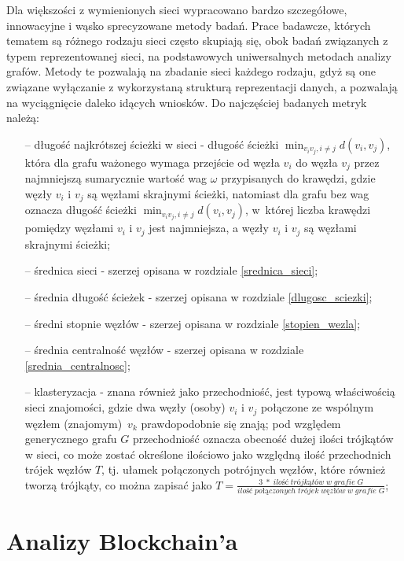 \documentclass[12pt, twoside, final, openany]{mgr}
\begin{document}
\indent Dla większości z wymienionych sieci wypracowano bardzo szczegółowe, innowacyjne i wąsko sprecyzowane metody badań. Prace badawcze, których tematem są różnego rodzaju sieci często skupiają się, obok badań związanych z typem reprezentowanej sieci, na podstawowych uniwersalnych metodach analizy grafów. Metody te pozwalają na zbadanie sieci każdego rodzaju, gdyż są one związane wyłączanie z wykorzystaną strukturą reprezentacji danych, a pozwalają na wyciągnięcie daleko idących wniosków. Do najczęściej badanych metryk należą\cite{barabasi2016network, wasserman1994social, Watts1998}:
\begin{itemize}
\item[--] długość najkrótszej ścieżki w sieci - długość ścieżki $\min_{v_iv_j, i \ne j} d(v_i, v_j)$, która dla grafu ważonego wymaga przejście od węzła $v_i$ do węzła $v_j$ przez najmniejszą sumarycznie wartość wag $\omega$ przypisanych do krawędzi, gdzie węzły $v_i$ i $v_j$ są węzłami skrajnymi ścieżki, natomiast dla grafu bez wag oznacza długość ścieżki $\min_{v_iv_j, i \ne j} d(v_i, v_j)$, w~której liczba krawędzi pomiędzy węzłami $v_i$ i $v_j$ jest najmniejsza, a węzły $v_i$ i $v_j$ są węzłami skrajnymi ścieżki;
\item[--] średnica sieci - szerzej opisana w rozdziale \ref{srednica_sieci};
\item[--] średnia długość ścieżek - szerzej opisana w rozdziale \ref{dlugosc_sciezki};
\item[--] średni stopnie węzłów - szerzej opisana w rozdziale \ref{stopien_wezla};
\item[--] średnia centralność węzłów - szerzej opisana w rozdziale \ref{srednia_centralnosc};
\item[--] klasteryzacja - znana również jako przechodniość, jest typową właściwością sieci znajomości, gdzie dwa węzły (osoby) $v_i$ i $v_j$ połączone ze wspólnym węzłem (znajomym)~$v_k$ prawdopodobnie się znają; pod względem generycznego grafu $G$ przechodniość oznacza obecność dużej ilości trójkątów w sieci, co może zostać określone ilościowo jako względną ilość przechodnich trójek węzłów $T$, tj. ułamek połączonych potrójnych węzłów, które również tworzą trójkąty, co można zapisać jako $T = \frac{3\; *\; ilość \; trójkątów \; w \; grafie \; G}{ilość \; połączonych \; trójek \; węzłów \; w \; grafie \; G}$;
\end{itemize}

\newpage
\section{Analizy Blockchain'a}
\end{document}
